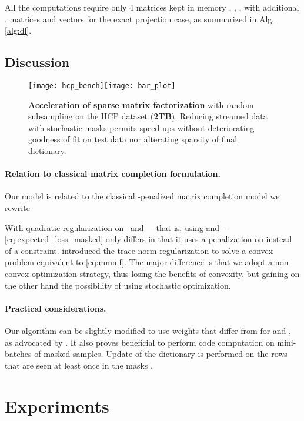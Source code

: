 \documentclass{article}
\begin{document}
All the computations require only 4 matrices kept in memory
, , ,  with additional ,  matrices and vectors for the exact
projection case, as summarized in Alg. \ref{alg:dl}.

\subsection{Discussion}
\label{sec:discussion}

\begin{figure*}[t]
  \centering
  \texttt{[image: hcp\_bench]}\texttt{[image: bar\_plot]}
  \caption{ \textbf{Acceleration of sparse matrix factorization} with random subsampling on the HCP dataset (\textbf{2TB}). Reducing streamed data with stochastic masks permits  speed-ups without deteriorating goodness of fit on test data nor alterating sparsity of final dictionary.} \label{fig:hcp_curve}
   \vspace{-.8em}
\end{figure*}

\paragraph{Relation to classical matrix completion formulation.}
Our model
is related to the classical -penalized matrix completion model \citep[\textit{e.g.}][]{bell_lessons_2007} we rewrite

With quadratic regularization on~ and~ --\,that is, using
 and~\,-- \eqref{eq:expected_loss_masked} only
differs in that it uses a penalization on  instead of a constraint. \citet{srebro_maximum-margin_2004}
 introduced the trace-norm regularization to solve a convex problem equivalent to \eqref{eq:mmmf}.
The major difference is that we adopt a non-convex optimization strategy, thus
losing the benefits of convexity, but gaining on the other hand the possibility
of using stochastic optimization.




\paragraph{Practical considerations.} Our algorithm can be slightly modified to use
weights  that differ from  for  and , as advocated by \citet{mairal_stochastic_2013}.
It also proves beneficial to perform code computation on mini-batches of masked
samples. Update of the dictionary is performed on the rows that are seen at
least once in the masks .

\section{Experiments}
\end{document}
